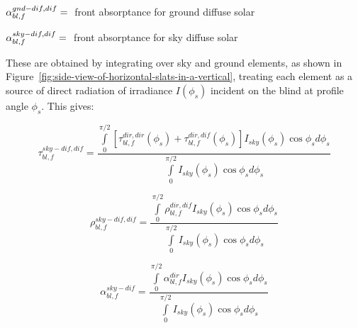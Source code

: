 \(\alpha_{bl,f}^{gnd - dif,dif} = {\rm{ }}\) front absorptance for ground diffuse solar

\(\alpha_{bl,f}^{sky - dif,dif} = {\rm{ }}\) front absorptance for sky diffuse solar

These are obtained by integrating over sky and ground elements, as shown in Figure~\ref{fig:side-view-of-horizontal-slats-in-a-vertical}, treating each element as a source of direct radiation of irradiance \(I({\phi_s})\) incident on the blind at profile angle \({\phi_s}\). This gives:

\begin{equation}
\tau_{bl,f}^{sky - dif,dif} = \frac{{\int\limits_0^{\pi /2} {\left[ {\tau_{bl,f}^{dir,dir}({\phi_s}) + \tau_{bl,f}^{dir,dif}({\phi_s})} \right]{I_{sky}}({\phi_s})\cos {\phi_s}d{\phi_s}} }}{{\int\limits_0^{\pi /2} {{I_{sky}}({\phi_s})\cos {\phi_s}d{\phi_s}} }}
\end{equation}

\begin{equation}
\rho_{bl,f}^{sky - dif,dif} = \frac{{\int\limits_0^{\pi /2} {\rho_{bl,f}^{dir,dif}{I_{sky}}({\phi_s})\cos {\phi_s}d{\phi_s}} }}{{\int\limits_0^{\pi /2} {{I_{sky}}({\phi_s})\cos {\phi_s}d{\phi_s}} }}
\end{equation}

\begin{equation}
\alpha_{bl,f}^{sky - dif} = \frac{{\int\limits_0^{\pi /2} {\alpha_{bl,f}^{dir}{I_{sky}}({\phi_s})\cos {\phi_s}d{\phi_s}} }}{{\int\limits_0^{\pi /2} {{I_{sky}}({\phi_s})\cos {\phi_s}d{\phi_s}} }}
\end{equation}

